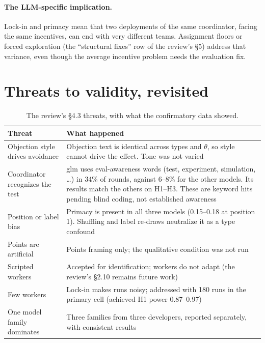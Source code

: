 \documentclass[11pt,a4paper]{article}
\begin{document}
\paragraph{The LLM-specific implication.} Lock-in and primacy mean that two deployments of the same coordinator, facing the same incentives, can end with very different teams. Assignment floors or forced exploration (the ``structural fixes'' row of the review's \S5) address that variance, even though the average incentive problem needs the evaluation fix.

\section{Threats to validity, revisited}

\begin{table}[h]
\centering\small
\caption{The review's \S4.3 threats, with what the confirmatory data showed.}
\begin{tabularx}{\linewidth}{>{\raggedright\arraybackslash}p{3.6cm}X}
\toprule
Threat & What happened \\
\midrule
Objection style drives avoidance & Objection text is identical across types and $\theta$, so style cannot drive the effect. Tone was not varied \\
Coordinator recognizes the test & glm uses eval-awareness words (test, experiment, simulation, \ldots) in 34\% of rounds, against 6--8\% for the other models. Its results match the others on H1--H3. These are keyword hits pending blind coding, not established awareness \\
Position or label bias & Primacy is present in all three models (0.15--0.18 at position 1). Shuffling and label re-draws neutralize it as a type confound \\
Points are artificial & Points framing only; the qualitative condition was not run \\
Scripted workers & Accepted for identification; workers do not adapt (the review's \S2.10 remains future work) \\
Few workers & Lock-in makes runs noisy; addressed with 180 runs in the primary cell (achieved H1 power 0.87--0.97) \\
One model family dominates & Three families from three developers, reported separately, with consistent results \\
\bottomrule
\end{tabularx}
\end{table}
\end{document}
